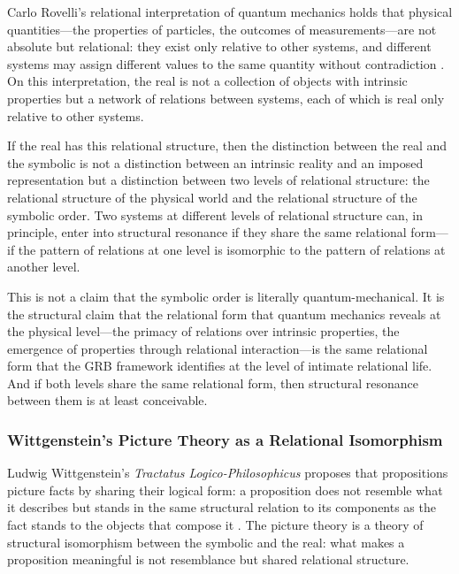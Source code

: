 \noindent
Carlo Rovelli's relational interpretation of quantum mechanics holds that physical quantities---the properties of particles, the outcomes of measurements---are not absolute but relational: they exist only relative to other systems, and different systems may assign different values to the same quantity without contradiction \parencite{rovelli1996}. On this interpretation, the real is not a collection of objects with intrinsic properties but a network of relations between systems, each of which is real only relative to other systems.

If the real has this relational structure, then the distinction between the real and the symbolic is not a distinction between an intrinsic reality and an imposed representation but a distinction between two levels of relational structure: the relational structure of the physical world and the relational structure of the symbolic order. Two systems at different levels of relational structure can, in principle, enter into structural resonance if they share the same relational form---if the pattern of relations at one level is isomorphic to the pattern of relations at another level.

This is not a claim that the symbolic order is literally quantum-mechanical. It is the structural claim that the relational form that quantum mechanics reveals at the physical level---the primacy of relations over intrinsic properties, the emergence of properties through relational interaction---is the same relational form that the GRB framework identifies at the level of intimate relational life. And if both levels share the same relational form, then structural resonance between them is at least conceivable.

\subsubsection{Wittgenstein's Picture Theory as a Relational Isomorphism}
\label{p15:subsubsec:wittgenstein}

\noindent
Ludwig Wittgenstein's \emph{Tractatus Logico-Philosophicus} proposes that propositions picture facts by sharing their logical form: a proposition does not resemble what it describes but stands in the same structural relation to its components as the fact stands to the objects that compose it \parencite{gadamer2004}. The picture theory is a theory of structural isomorphism between the symbolic and the real: what makes a proposition meaningful is not resemblance but shared relational structure.

